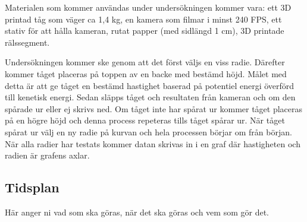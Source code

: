 Materialen som kommer användas under undersökningen kommer vara: ett 3D printad tåg som väger ca 1,4 kg, en kamera som filmar i minst 240 FPS, ett stativ för att hålla kameran, rutat papper (med sidlängd 1 cm), 3D printade rälssegment.

Undersökningen kommer ske genom att det först väljs en viss radie. Därefter kommer tåget placeras på toppen av en backe med bestämd höjd. Målet med detta är att ge tåget en bestämd hastighet baserad på potentiel energi överförd till kenetisk energi. Sedan släpps tåget och resultaten från kameran och om den spårade ur eller ej skrivs ned. Om tåget inte har spårat ur kommer tåget placeras på en högre höjd och denna process repeteras tills tåget spårar ur. När tåget spårat ur välj en ny radie på kurvan och hela processen börjar om från början. När alla radier har testats kommer datan skrivas in i en graf där hastigheten och radien är grafens axlar.



\subsection{Tidsplan}
Här anger ni vad som ska göras, när det ska göras och vem som gör det.
